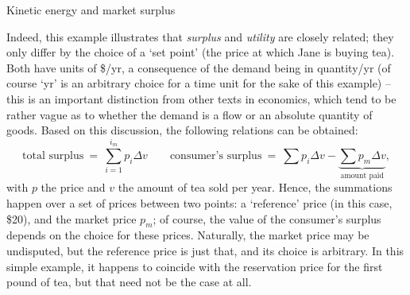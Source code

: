 \begin{econ}{Kinetic energy and market surplus}
\begin{center}
        
    \end{center}
    Indeed, this example illustrates that \emph{surplus} and \emph{utility} are closely related; they only differ by the choice of a `set point' (the price at which Jane is buying tea). 
    Both have units of \$/yr, a consequence of the demand being in quantity/yr (of course `yr' is an arbitrary choice for a time unit for the sake of this example) -- this is an important distinction from other texts in economics, which tend to be rather vague as to whether the demand is a flow or an absolute quantity of goods. Based on this discussion, the following relations can be obtained:
    \begin{equation}
        \text{total surplus}\: =\: \sum_{i = 1}^{i_m} p_i \Delta v \qquad \text{consumer's surplus} \:=\: \sum p_i \Delta v - \underbrace{\sum p_m \Delta v}_{\text{amount paid}},
    \label{eq:surplus}
    \end{equation}
    with $p$ the price and $v$ the amount of tea sold per year. Hence, the summations happen over a set of prices between two points: a `reference' price (in this case, \$20), and the market price $p_m$; of course, the value of the consumer's surplus depends on the choice for these prices. Naturally, the market price may be undisputed, but the reference price is just that, and its choice is arbitrary. In this simple example, it happens to coincide with the reservation price for the first pound of tea, but that need not be the case at all.


\end{econ}
